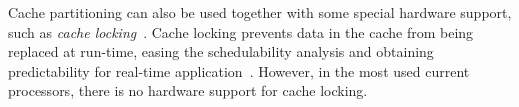 \documentclass[conference]{IEEEtran}
\begin{document}
Cache partitioning can also be used together with some special hardware support, such as \textit{cache locking}~\cite{Suhendra2008}. Cache locking prevents data in the cache from being replaced at run-time, easing the schedulability analysis and obtaining predictability for real-time application~\cite{Suhendra2008}. However, in the most used current processors, there is no hardware support for cache locking. 


\end{document}
